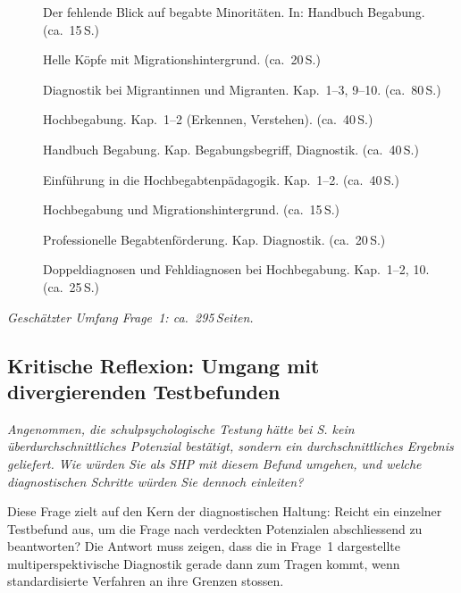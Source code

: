 \documentclass[ngerman, a4paper]{article}
\begin{document}
\begin{description}
  \item[\cite{stamm2021fehlenderblick}] Der fehlende Blick auf begabte Minoritäten. In: Handbuch Begabung. (ca.~15\,S.)
  \item[\cite{kellerkoller2021hellekoepfe}] Helle Köpfe mit Migrationshintergrund. (ca.~20\,S.)
  \item[\cite{maehler2018diagnostik}] Diagnostik bei Migrantinnen und Migranten. Kap.~1--3, 9--10. (ca.~80\,S.)
  \item[\cite{preckel2013hochbegabung}] Hochbegabung. Kap.~1--2 (Erkennen, Verstehen). (ca.~40\,S.)
  \item[\cite{muelleroppliger2021handbuch}] Handbuch Begabung. Kap. Begabungsbegriff, Diagnostik. (ca.~40\,S.)
  \item[\cite{trautmann2016einfuehrung}] Einführung in die Hochbegabtenpädagogik. Kap.~1--2. (ca.~40\,S.)
  \item[\cite{reutlinger2015hochbegabung}] Hochbegabung und Migrationshintergrund. (ca.~15\,S.)
  \item[\cite{ipege2009professionelle}] Professionelle Begabtenförderung. Kap. Diagnostik. (ca.~20\,S.)
  \item[\cite{webb2020doppeldiagnosen}] Doppeldiagnosen und Fehldiagnosen bei
    Hochbegabung. Kap.~1--2, 10. (ca.~25\,S.)
\end{description}
 
\textit{Geschätzter Umfang Frage~1: ca.~295\,Seiten.}
 

 

\subsection{Kritische Reflexion: Umgang mit divergierenden Testbefunden}


\begin{tcolorbox}[colback=gray!5, colframe=gray!50, title=Weiterführende Diskurslinie]
\itshape
Angenommen, die schulpsychologische Testung hätte bei S. kein überdurchschnittliches
Potenzial bestätigt, sondern ein durchschnittliches Ergebnis geliefert. Wie würden Sie
als SHP mit diesem Befund umgehen, und welche diagnostischen Schritte würden Sie
dennoch einleiten?
\end{tcolorbox}

Diese Frage zielt auf den Kern der diagnostischen Haltung: Reicht ein einzelner
Testbefund aus, um die Frage nach verdeckten Potenzialen abschliessend zu beantworten?
Die Antwort muss zeigen, dass die in Frage~1 dargestellte multiperspektivische
Diagnostik gerade dann zum Tragen kommt, wenn standardisierte Verfahren an ihre
Grenzen stossen.
\end{document}
